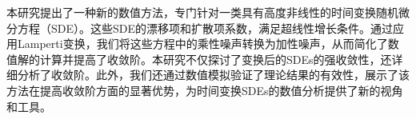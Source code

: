 

\begin{cnabstract}


本研究提出了一种新的数值方法，专门针对一类具有高度非线性的时间变换随机微分方程（SDE）。这些SDE的漂移项和扩散项系数，满足超线性增长条件。通过应用Lamperti变换，我们将这些方程中的乘性噪声转换为加性噪声，从而简化了数值解的计算并提高了收敛阶。本研究不仅探讨了变换后的SDEs的强收敛性，还详细分析了收敛阶。此外，我们还通过数值模拟验证了理论结果的有效性，展示了该方法在提高收敛阶方面的显著优势，为时间变换SDEs的数值分析提供了新的视角和工具。




\end{cnabstract}

